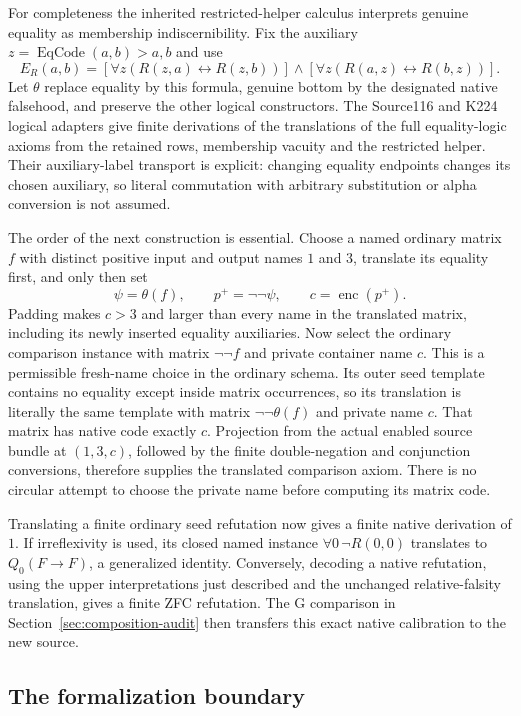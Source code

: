 For completeness the inherited restricted-helper calculus interprets
genuine equality as membership indiscernibility.  Fix the auxiliary
$z=\operatorname{EqCode}(a,b)>a,b$ and use
\[
 E_R(a,b)=
 [\forall z(R(z,a)\leftrightarrow R(z,b))]\land
 [\forall z(R(a,z)\leftrightarrow R(b,z))].
\]
Let $\theta$ replace equality by this formula, genuine bottom by the
designated native falsehood, and preserve the other logical
constructors.  The Source116 and K224 logical adapters give finite
derivations of the translations of the full equality-logic axioms from
the retained rows, membership vacuity and the restricted helper.
Their auxiliary-label transport is explicit: changing equality
endpoints changes its chosen auxiliary, so literal commutation with
arbitrary substitution or alpha conversion is not assumed.

The order of the next construction is essential.  Choose a named
ordinary matrix $f$ with distinct positive input and output names $1$
and $3$, translate its equality first, and only then set
\[
       \psi=\theta(f),\qquad
       p^+=\neg\neg\psi,\qquad
       c=\operatorname{enc}(p^+).
\]
Padding makes $c>3$ and larger than every name in the translated
matrix, including its newly inserted equality auxiliaries.  Now select
the ordinary comparison instance with matrix $\neg\neg f$ and
private container name $c$.  This is a permissible fresh-name choice
in the ordinary schema.  Its outer seed template contains no equality
except inside matrix occurrences, so its translation is literally the
same template with matrix $\neg\neg\theta(f)$ and private name $c$.
That matrix has native code exactly $c$.  Projection from the actual
enabled source bundle at $(1,3,c)$, followed by the finite
double-negation and conjunction conversions, therefore supplies the
translated comparison axiom.  There is no circular attempt to choose
the private name before computing its matrix code.

Translating a finite ordinary seed refutation now gives a finite native
derivation of $1$.  If irreflexivity is used, its closed named instance
$\forall0\,\neg R(0,0)$ translates to
$Q_0(F\to F)$, a generalized identity.  Conversely, decoding a native
refutation, using the upper interpretations just described and the
unchanged relative-falsity translation, gives a finite ZFC refutation.
The G comparison in Section~\ref{sec:composition-audit} then transfers
this exact native calibration to the new source.

\subsection{The formalization boundary}

